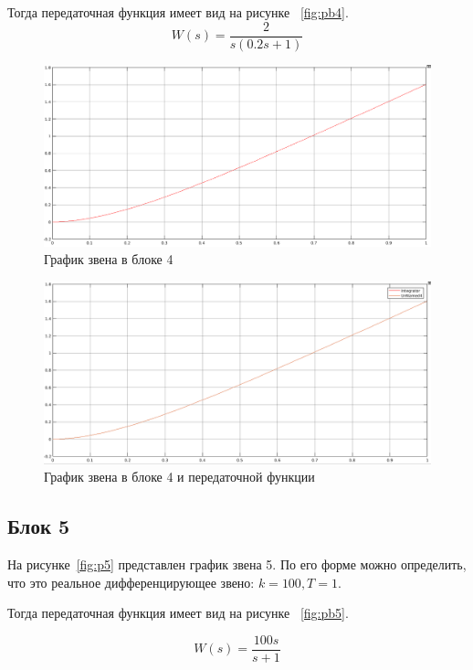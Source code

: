 \documentclass[12pt, a4paper] {ncc}
\begin{document}
		Тогда передаточная функция имеет вид на рисунке ~\ref{fig:pb4}.
		\[ W(s) = \dfrac {2} {s(0.2 s + 1)}\]

    	\begin{figure}[ht!]
    		\includegraphics[scale=0.3]{./plot4.png}
			\caption{График звена в блоке 4}
			\label{fig:p3}
    	\end{figure}
    	\begin{figure}[ht!]
    		\includegraphics[scale=0.3]{./plot_both4.png}
			\caption{График звена в блоке 4 и передаточной функции}
			\label{fig:pb3}
    	\end{figure}

    \subsection{Блок 5}

		На рисунке~\ref{fig:p5} представлен график звена 5. По его форме можно определить,
		что это реальное дифференцирующее звено: $k = 100, T = 1$.
		
		Тогда передаточная функция имеет вид на рисунке ~\ref{fig:pb5}.

		\[ W(s) = \dfrac {100s} {s + 1}\]
\end{document}
